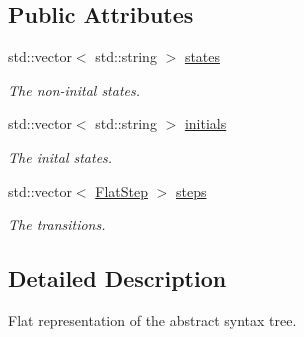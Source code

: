 \subsection*{Public Attributes}
\begin{DoxyCompactItemize}
\item 
\hypertarget{structfsml_1_1FlatMachine_a5f3c317f5a3a8f13f10160dcaeef63e3}{std\-::vector$<$ std\-::string $>$ \hyperlink{structfsml_1_1FlatMachine_a5f3c317f5a3a8f13f10160dcaeef63e3}{states}}\label{structfsml_1_1FlatMachine_a5f3c317f5a3a8f13f10160dcaeef63e3}

\begin{DoxyCompactList}\small\item\em The non-\/inital states. \end{DoxyCompactList}\item 
\hypertarget{structfsml_1_1FlatMachine_a3069121ea01eab1cec46590ab186b622}{std\-::vector$<$ std\-::string $>$ \hyperlink{structfsml_1_1FlatMachine_a3069121ea01eab1cec46590ab186b622}{initials}}\label{structfsml_1_1FlatMachine_a3069121ea01eab1cec46590ab186b622}

\begin{DoxyCompactList}\small\item\em The inital states. \end{DoxyCompactList}\item 
\hypertarget{structfsml_1_1FlatMachine_a2fc01c07d6bc3f62fba880e96e538390}{std\-::vector$<$ \hyperlink{structfsml_1_1FlatStep}{Flat\-Step} $>$ \hyperlink{structfsml_1_1FlatMachine_a2fc01c07d6bc3f62fba880e96e538390}{steps}}\label{structfsml_1_1FlatMachine_a2fc01c07d6bc3f62fba880e96e538390}

\begin{DoxyCompactList}\small\item\em The transitions. \end{DoxyCompactList}\end{DoxyCompactItemize}


\subsection{Detailed Description}
Flat representation of the abstract syntax tree. 



